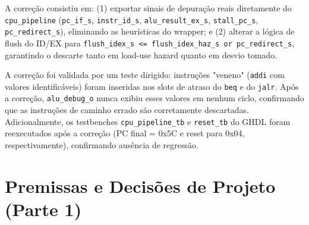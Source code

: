 \documentclass[12pt, a4paper]{article}
\newcommand{\code}[1]{\texttt{#1}}
\begin{document}
A correção consistiu em: (1) exportar sinais de depuração reais
diretamente do \code{cpu\_pipeline} (\code{pc\_if\_s}, \code{instr\_id\_s},
\code{alu\_result\_ex\_s}, \code{stall\_pc\_s}, \code{pc\_redirect\_s}), eliminando
as heurísticas do wrapper; e (2) alterar a lógica de flush do ID/EX para 
\code{flush\_idex\_s <= flush\_idex\_haz\_s or pc\_redirect\_s}, garantindo o
descarte tanto em load-use hazard quanto em desvio tomado.

A correção foi validada por um teste dirigido: instruções
"veneno" (\code{addi} com valores identificáveis) foram inseridas nos
slots de atraso do \code{beq} e do \code{jalr}.
Após a correção,
\code{alu\_debug\_o} nunca exibiu esses valores em nenhum ciclo, confirmando
que as instruções de caminho errado são corretamente descartadas.
Adicionalmente, os testbenches \code{cpu\_pipeline\_tb} e \code{reset\_tb} do
GHDL foram reexecutados após a correção (PC final = 0x5C e reset para
0x04, respectivamente), confirmando ausência de regressão.


\section{Premissas e Decisões de Projeto (Parte 1)}
\end{document}
